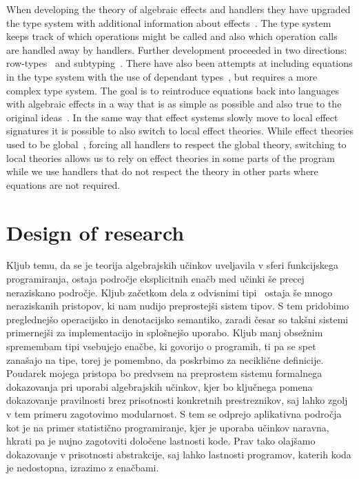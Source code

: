 \documentclass{article}
\begin{document}
When developing the theory of algebraic effects and handlers they have upgraded the type system with additional information about effects~\cite{DBLP:conf/esop/PlotkinP09}. The type system keeps track of which operations might be called and also which operation calls are handled away by handlers. Further development proceeded in two directions: row-types~\cite{DBLP:conf/icfp/HillerstromL16} and subtyping~\cite{DBLP:conf/esop/SalehKPS18}. There have also been attempts at including equations in the type system with the use of dependant types~\cite{DBLP:journals/pacmpl/Ahman18}, but requires a more complex type system. The goal is to reintroduce equations back into languages with algebraic effects in a way that is as simple as possible and also true to the original ideas~\cite{DBLP:phd/ethos/Pretnar10}. In the same way that effect systems slowly move to local effect signatures it is possible to also switch to local effect theories. While effect theories used to be global~\cite{DBLP:conf/esop/PlotkinP09}, forcing all handlers to respect the global theory, switching to local theories allows us to rely on effect theories in some parts of the program while we use handlers that do not respect the theory in other parts where equations are not required.


\section*{Design of research}

Kljub temu, da se je teorija algebrajskih učinkov uveljavila v sferi funkcijskega programiranja, ostaja področje eksplicitnih enačb med učinki še precej neraziskano področje. Kljub začetkom dela z odvisnimi tipi~\cite{DBLP:journals/pacmpl/Ahman18} ostaja še mnogo neraziskanih pristopov, ki nam nudijo preprostejši sistem tipov. S tem pridobimo preglednejšo operacijsko in denotacijsko semantiko, zaradi česar so takšni sistemi primernejši za implementacijo in splošnejšo uporabo. Kljub manj obsežnim spremembam tipi vsebujejo enačbe, ki govorijo o programih, ti pa se spet zanašajo na tipe, torej je pomembno, da poskrbimo za neciklične definicije. Poudarek mojega pristopa bo predvsem na preprostem sistemu formalnega dokazovanja pri uporabi algebrajskih učinkov, kjer bo ključnega pomena dokazovanje pravilnosti brez prisotnosti konkretnih prestreznikov, saj lahko zgolj v tem primeru zagotovimo modularnost. S tem se odprejo aplikativna področja kot je na primer statistično programiranje, kjer je uporaba učinkov naravna, hkrati pa je nujno zagotoviti določene lastnosti kode. Prav tako olajšamo dokazovanje v prisotnosti abstrakcije, saj lahko lastnosti programov, katerih koda je nedostopna, izrazimo z enačbami.
\end{document}

